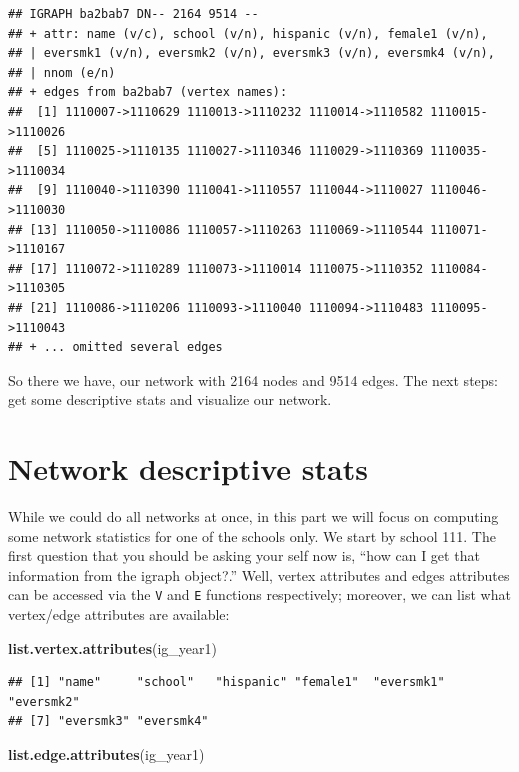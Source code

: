 \documentclass[]{book}
\newenvironment{Shaded}{\begin{snugshade}}{\end{snugshade}}
\newcommand{\KeywordTok}[1]{\textcolor[rgb]{0.13,0.29,0.53}{\textbf{#1}}}
\newcommand{\NormalTok}[1]{#1}
\theoremstyle{definition}
\theoremstyle{definition}
\theoremstyle{definition}
\theoremstyle{remark}
\begin{document}
\begin{verbatim}
## IGRAPH ba2bab7 DN-- 2164 9514 -- 
## + attr: name (v/c), school (v/n), hispanic (v/n), female1 (v/n),
## | eversmk1 (v/n), eversmk2 (v/n), eversmk3 (v/n), eversmk4 (v/n),
## | nnom (e/n)
## + edges from ba2bab7 (vertex names):
##  [1] 1110007->1110629 1110013->1110232 1110014->1110582 1110015->1110026
##  [5] 1110025->1110135 1110027->1110346 1110029->1110369 1110035->1110034
##  [9] 1110040->1110390 1110041->1110557 1110044->1110027 1110046->1110030
## [13] 1110050->1110086 1110057->1110263 1110069->1110544 1110071->1110167
## [17] 1110072->1110289 1110073->1110014 1110075->1110352 1110084->1110305
## [21] 1110086->1110206 1110093->1110040 1110094->1110483 1110095->1110043
## + ... omitted several edges
\end{verbatim}

So there we have, our network with 2164 nodes and 9514 edges. The next
steps: get some descriptive stats and visualize our network.

\section{Network descriptive stats}\label{network-descriptive-stats}

While we could do all networks at once, in this part we will focus on
computing some network statistics for one of the schools only. We start
by school 111. The first question that you should be asking your self
now is, ``how can I get that information from the igraph object?.''
Well, vertex attributes and edges attributes can be accessed via the
\texttt{V} and \texttt{E} functions respectively; moreover, we can list
what vertex/edge attributes are available:

\begin{Shaded}
\begin{Highlighting}[]
\KeywordTok{list.vertex.attributes}\NormalTok{(ig_year1)}
\end{Highlighting}
\end{Shaded}

\begin{verbatim}
## [1] "name"     "school"   "hispanic" "female1"  "eversmk1" "eversmk2"
## [7] "eversmk3" "eversmk4"
\end{verbatim}

\begin{Shaded}
\begin{Highlighting}[]
\KeywordTok{list.edge.attributes}\NormalTok{(ig_year1) }
\end{Highlighting}
\end{Shaded}
\end{document}
